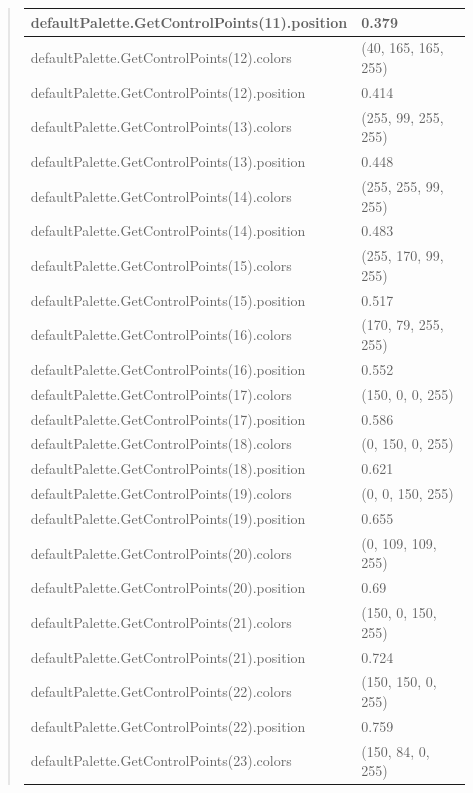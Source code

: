 \documentclass[letterpaper,10pt,english]{sphinxmanual}
\begin{document}
\begin{quote}
\begin{longtable}{|p{0.475\linewidth}|p{0.475\linewidth}|}
\hline
defaultPalette.GetControlPoints(11).position
 & 
0.379
\\
\hline
defaultPalette.GetControlPoints(12).colors
 & 
(40, 165, 165, 255)
\\
\hline
defaultPalette.GetControlPoints(12).position
 & 
0.414
\\
\hline
defaultPalette.GetControlPoints(13).colors
 & 
(255, 99, 255, 255)
\\
\hline
defaultPalette.GetControlPoints(13).position
 & 
0.448
\\
\hline
defaultPalette.GetControlPoints(14).colors
 & 
(255, 255, 99, 255)
\\
\hline
defaultPalette.GetControlPoints(14).position
 & 
0.483
\\
\hline
defaultPalette.GetControlPoints(15).colors
 & 
(255, 170, 99, 255)
\\
\hline
defaultPalette.GetControlPoints(15).position
 & 
0.517
\\
\hline
defaultPalette.GetControlPoints(16).colors
 & 
(170, 79, 255, 255)
\\
\hline
defaultPalette.GetControlPoints(16).position
 & 
0.552
\\
\hline
defaultPalette.GetControlPoints(17).colors
 & 
(150, 0, 0, 255)
\\
\hline
defaultPalette.GetControlPoints(17).position
 & 
0.586
\\
\hline
defaultPalette.GetControlPoints(18).colors
 & 
(0, 150, 0, 255)
\\
\hline
defaultPalette.GetControlPoints(18).position
 & 
0.621
\\
\hline
defaultPalette.GetControlPoints(19).colors
 & 
(0, 0, 150, 255)
\\
\hline
defaultPalette.GetControlPoints(19).position
 & 
0.655
\\
\hline
defaultPalette.GetControlPoints(20).colors
 & 
(0, 109, 109, 255)
\\
\hline
defaultPalette.GetControlPoints(20).position
 & 
0.69
\\
\hline
defaultPalette.GetControlPoints(21).colors
 & 
(150, 0, 150, 255)
\\
\hline
defaultPalette.GetControlPoints(21).position
 & 
0.724
\\
\hline
defaultPalette.GetControlPoints(22).colors
 & 
(150, 150, 0, 255)
\\
\hline
defaultPalette.GetControlPoints(22).position
 & 
0.759
\\
\hline
defaultPalette.GetControlPoints(23).colors
 & 
(150, 84, 0, 255)

\end{longtable}
\end{quote}
\end{document}
